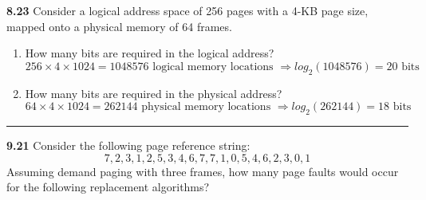 \documentclass[12pt]{jhwhw}
\begin{document}
\textbf{8.23}  
	Consider a logical address space of 256 pages with a 4-KB page size, mapped onto a physical
	memory of 64 frames.
	\begin{enumerate}
		\item How many bits are required in the logical address? \\
			$$256\times 4\times 1024 = 1048576\text{ logical memory locations }
			\Rightarrow log_2(1048576) = 20\text{ bits }$$
		\item How many bits are required in the physical address?
			$$64\times 4\times 1024 = 262144\text{ physical memory locations }
			\Rightarrow log_2(262144) = 18\text{ bits }$$
	\end{enumerate}
\textcolor[RGB]{240,240,240}{\rule{\textwidth}{0.5pt}}\bigbreak

\textbf{9.21}  
	Consider the following page reference string: \\
	$$ 7,2,3,1,2,5,3,4,6,7,7,1,0,5,4,6,2,3,0,1 $$
	Assuming demand paging with three frames, how many page faults would occur for the following
	replacement algorithms?
\end{document}
